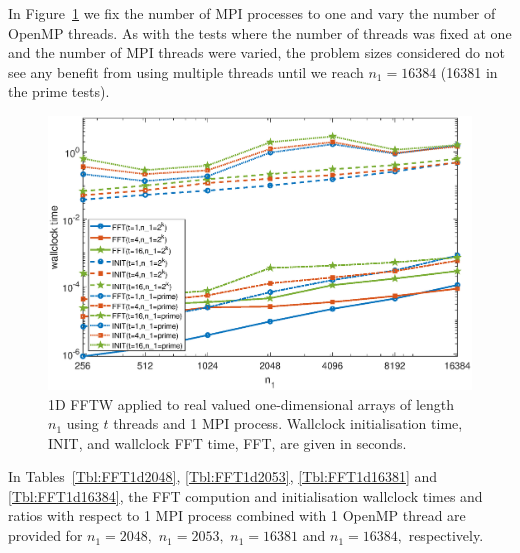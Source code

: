 \documentclass[a4]{article}
\begin{document}
In Figure~\ref{Fig:fftw1d_threads_times} we fix the number of MPI processes to one and vary the number of OpenMP threads. As with the tests where the number of threads was fixed at one and the number of MPI threads were varied, the problem sizes considered do not see any benefit from using multiple threads until we reach $n_1=16384$ (16381 in the prime tests). 


\begin{figure}[!htbp]
\begin{center}
 \includegraphics[width=.9\textwidth, height=0.42\textheight]{FFTW1D_threads_times_fig.eps}
\caption{1D FFTW applied to real valued one-dimensional arrays of length $n_1$ using $t$ threads and 1 MPI process. Wallclock initialisation time, INIT, and wallclock FFT time, FFT, are given in seconds.}
\label{Fig:fftw1d_threads_times}
\end{center}
\end{figure}




In Tables~\ref{Tbl:FFT1d2048}, \ref{Tbl:FFT1d2053}, \ref{Tbl:FFT1d16381} and \ref{Tbl:FFT1d16384},  the FFT compution and initialisation wallclock times and ratios with respect to 1 MPI process combined with 1 OpenMP thread are provided for $n_1=2048,$ $n_1=2053,$  $n_1=16381$ and  $n_1=16384,$ respectively.
\end{document}
